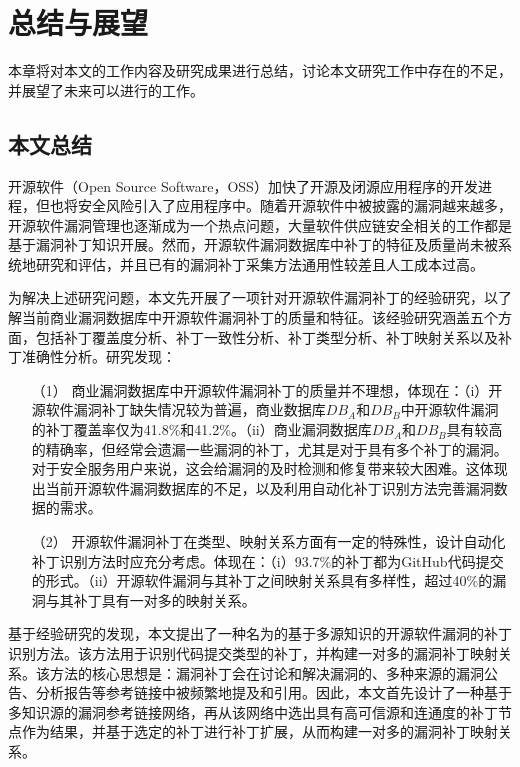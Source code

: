 \chapter{总结与展望}

本章将对本文的工作内容及研究成果进行总结，讨论本文研究工作中存在的不足，并展望了未来可以进行的工作。

\section{本文总结}
开源软件（Open Source Software，OSS）加快了开源及闭源应用程序的开发进程，但也将安全风险引入了应用程序中。随着开源软件中被披露的漏洞越来越多，开源软件漏洞管理也逐渐成为一个热点问题，大量软件供应链安全相关的工作都是基于漏洞补丁知识开展。然而，开源软件漏洞数据库中补丁的特征及质量尚未被系统地研究和评估，并且已有的漏洞补丁采集方法通用性较差且人工成本过高。

为解决上述研究问题，本文先开展了一项针对开源软件漏洞补丁的经验研究，以了解当前商业漏洞数据库中开源软件漏洞补丁的质量和特征。该经验研究涵盖五个方面，包括补丁覆盖度分析、补丁一致性分析、补丁类型分析、补丁映射关系以及补丁准确性分析。研究发现：
\begin{enumerate}
    \item [（1）]商业漏洞数据库中开源软件漏洞补丁的质量并不理想，体现在：（i）开源软件漏洞补丁缺失情况较为普遍，商业数据库$DB_A$和$DB_B$中开源软件漏洞的补丁覆盖率仅为41.8\%和41.2\%。（ii）商业漏洞数据库$DB_A$和$DB_B$具有较高的精确率，但经常会遗漏一些漏洞的补丁，尤其是对于具有多个补丁的漏洞。对于安全服务用户来说，这会给漏洞的及时检测和修复带来较大困难。这体现出当前开源软件漏洞数据库的不足，以及利用自动化补丁识别方法完善漏洞数据的需求。
    \item [（2）]开源软件漏洞补丁在类型、映射关系方面有一定的特殊性，设计自动化补丁识别方法时应充分考虑。体现在：（i）93.7\%的补丁都为GitHub代码提交的形式。（ii）开源软件漏洞与其补丁之间映射关系具有多样性，超过40\%的漏洞与其补丁具有一对多的映射关系。
\end{enumerate}

基于经验研究的发现，本文提出了一种名为\tool 的基于多源知识的开源软件漏洞的补丁识别方法。该方法用于识别代码提交类型的补丁，并构建一对多的漏洞补丁映射关系。该方法的核心思想是：漏洞补丁会在讨论和解决漏洞的、多种来源的漏洞公告、分析报告等参考链接中被频繁地提及和引用。因此，本文首先设计了一种基于多知识源的漏洞参考链接网络，再从该网络中选出具有高可信源和连通度的补丁节点作为结果，并基于选定的补丁进行补丁扩展，从而构建一对多的漏洞补丁映射关系。

